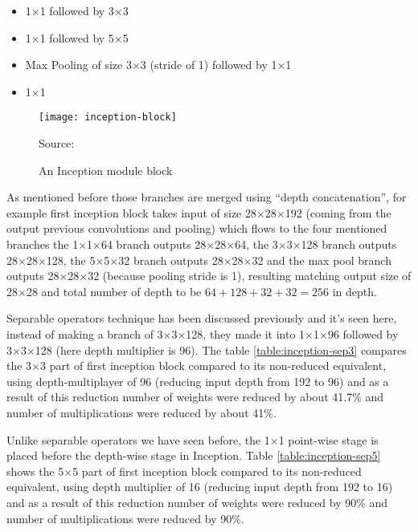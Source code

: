 \begin{itemize}
\item 1×1 followed by 3×3
\item 1×1 followed by 5×5
\item Max Pooling of size 3×3 (stride of 1) followed by 1×1
\item 1×1
\end{itemize}


\begin{figure}[!h]
\centering
\texttt{[image: inception-block]}
\caption{An Inception module block}\label{fig:inception-block}
{Source: \autocite{szegedy2015going}\hfill}
\end{figure}


As mentioned before those branches are merged using ``depth concatenation'', for example first inception block takes
input of size 28×28×192 (coming from the output previous convolutions and pooling)
which flows to the four mentioned branches
the 1×1×64 branch outputs 28×28×64, the 3×3×128 branch outputs 28×28×128, the 5×5×32 branch outputs 28×28×32
and the max pool branch outputs 28×28×32 (because pooling stride is 1),
resulting matching output size of 28×28 and total number of depth to be \( 64+128+32+32 = 256 \) in depth.

Separable operators technique has been discussed previously and it's seen here,
instead of making a branch of 3×3×128,
they made it into 1×1×96 followed by 3×3×128 (here depth multiplier is 96).
The table \ref{table:inception-sep3} compares the 3×3 part of first inception block compared to its non-reduced equivalent,
using depth-multiplayer of 96 (reducing input depth from 192 to 96)
and as a result of this reduction number of weights were reduced by about 41.7\% and number of multiplications were reduced by about 41\%. 

Unlike separable operators we have seen before, the 1×1 point-wise stage is placed before the depth-wise stage in Inception.
Table \ref{table:inception-sep5} shows the 5×5 part of first inception block compared to its non-reduced equivalent,
using depth multiplier of 16 (reducing input depth from 192 to 16)
and as a result of this reduction number of weights were reduced by 90\%
and number of multiplications were reduced by 90\%. 



